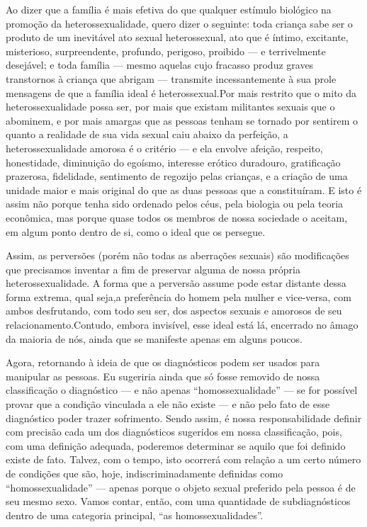 Ao dizer que a família\idxinflu{} é mais efetiva do que qualquer estímulo
biológico na promoção da heterossexualidade,\idxheterocrit{} quero dizer o seguinte:
toda criança sabe ser o produto de um inevitável ato sexual
heterossexual, ato que é íntimo, excitante, misterioso, surpreendente,
profundo, perigoso, proibido --- e terrivelmente desejável; e toda
família --- mesmo aquelas cujo fracasso produz graves transtornos à
criança que abrigam --- transmite incessantemente à sua prole
mensagens de que a família ideal é heterossexual.\idxheteroinfl[|)] Por mais restrito que
o mito da heterossexualidade possa ser, por mais que existam militantes
sexuais que o abominem, e por mais amargas que as pessoas tenham se
tornado por sentirem o quanto a realidade de sua vida sexual caiu
abaixo da perfeição, a heterossexualidade amorosa é o critério --- e
ela envolve afeição, respeito, honestidade, diminuição do egoísmo,
interesse erótico duradouro, gratificação prazerosa, fidelidade,
sentimento de regozijo pelas crianças, e a criação de uma unidade maior
e mais original do que as duas pessoas que a constituíram. E isto é
assim não porque tenha sido ordenado pelos céus, pela biologia ou pela
teoria econômica, mas porque quase todos os membros de nossa sociedade
o aceitam, em algum ponto dentro de si, como o ideal que os persegue.

Assim, as perversões (porém não todas as aberrações sexuais) são
modificações que precisamos inventar a fim de preservar alguma de nossa
própria heterossexualidade. A forma que a perversão assume pode estar
distante dessa forma extrema, qual seja,\idxhomoshete[|)] a preferência do homem pela
mulher e vice-versa, com ambos desfrutando, com todo seu ser, dos
aspectos sexuais e amorosos de seu relacionamento.\idxheterocrit[|)] Contudo, embora
invisível, esse ideal está lá, encerrado no âmago da maioria de nós,
ainda que se manifeste apenas em alguns poucos.

Agora, retornando à ideia de que os diagnósticos podem ser usados
para manipular as pessoas.\idxhomosaspe{} Eu sugeriria ainda que só fosse removido de
nossa classificação o diagnóstico --- e não apenas
``homossexualidade'' --- se for possível
provar que a condição vinculada a ele não existe --- e não pelo fato
de esse diagnóstico poder trazer sofrimento. Sendo assim, é nossa
responsabilidade definir com precisão cada um dos diagnósticos
sugeridos em nossa classificação, pois, com uma definição adequada,
poderemos determinar se aquilo que foi definido existe de fato. Talvez,
com o tempo, isto ocorrerá com relação a um certo número de condições
que são, hoje, indiscriminadamente definidas como
``homossexualidade'' --- apenas porque o
objeto sexual preferido pela pessoa é de seu mesmo sexo. Vamos contar,
então, com uma quantidade de subdiagnósticos dentro de uma categoria
principal, ``as homossexualidades''.

